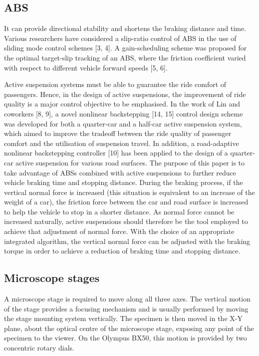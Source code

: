 \documentclass[10pt,twocolumn]{witseiepaper}
\begin{document}
\subsection{ABS}

It can provide directional stability and shortens the braking distance and time. Various researchers have considered a slip-ratio control of ABS in the use of sliding mode control schemes [3, 4]. A gain-scheduling scheme was proposed for the optimal target-slip tracking of an ABS, where the friction coefficient varied with respect to different vehicle forward speeds [5, 6]. 

Active suspension systems must be able to guarantee the ride comfort of passengers. Hence, in the design of active suspensions, the improvement of ride quality is a major control objective to be emphasised. In the work of Lin and coworkers [8, 9], a novel nonlinear backstepping [14, 15] control design scheme was developed for both a quarter-car and a half-car active suspension system, which aimed to improve the tradeoff between the ride quality of passenger comfort and the utilisation of suspension travel. In addition, a road-adaptive nonlinear backstepping controller [10] has been applied to the design of a quarter-car active suspension for various road surfaces. The purpose of this paper is to take advantage of ABSs combined with active suspensions to further reduce vehicle braking time and stopping distance. During the braking process, if the vertical normal force is increased (this situation is equivalent to an increase of the weight of a car), the friction force between the car and road surface is increased to help the vehicle to stop in a shorter distance. As normal force cannot be increased naturally, active suspensions should therefore be the tool employed to achieve that adjustment of normal force. With the choice of an appropriate integrated algorithm, the vertical normal force can be adjusted with the braking torque in order to achieve a reduction of braking time and stopping distance.

\subsection{Microscope stages}

A microscope stage is required to move along all three axes.  The vertical
motion of the stage provides a focusing mechanism and is usually performed by
moving the stage mounting system vertically.  The specimen is then moved in
the X-Y plane, about the optical centre of the microscope stage, exposing any
point of the specimen to the viewer.  On the Olympus BX50, this motion is
provided by two concentric rotary dials.
\end{document}
